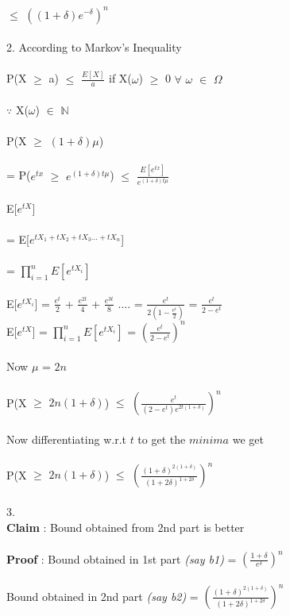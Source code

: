\documentclass{article}
\begin{document}
$\leq$ $((1 + \delta)e^{-\delta})^{n}$ \\\\
2.
According to Markov's Inequality \\\\
P(X $\geq$ a) $\leq$ $\frac{E[X]}{a}$ if X($\omega$) $\geq$ 0 $\forall$ $\omega$ $\in$ $\Omega$ \\\\
$\because$ X($\omega$) $\in$ $\mathbb{N}$ \\\\ 
P(X $\geq$ $(1 + \delta)\mu$) \\\\
= P($e^{tx}$ $\geq$ $e^{(1 + \delta)t\mu}$) $\leq$ $\frac{E[e^{tx}]}{e^{(1 + \delta)t\mu}}$\\\\
E[$e^{tX}$] \\\\
= E[$e^{tX_1 + tX_2 + tX_3 ... + tX_n}$] \\\\
=  $\prod_{i=1}^{n} E[e^{tX_i}]$ \\\\
E[$e^{tX_i}$] = $\frac{e^{t}}{2}$ + $\frac{e^{2t}}{4}$ + $\frac{e^{3t}}{8}$ .... 
= $\frac{e^{t}}{2(1-\frac{e^{t}}{2})}$
= $\frac{e^{t}}{2 - e^{t}}$ \\
E[$e^{tX}$] = $\prod_{i=1}^{n} E[e^{tX_i}]$ = $(\frac{e^{t}}{2 - e^{t}})^{n}$ \\\\
Now $\mu$ = $2n$ \\\\
P(X $\geq$ $2n(1 + \delta)$) $\leq$ $(\frac{e^{t}}{(2 - e^{t})e^{2t(1+\delta)}})^{n}$\\\\
Now differentiating w.r.t $t$ to get the $minima$ we get \\\\
P(X $\geq$ $2n(1+\delta)$) $\leq$ $(\frac{(1+\delta)^{2(1+\delta)}}{(1+2\delta)^{1+2\delta}})^{n}$ \\\\
3. \\
\textbf{Claim} : Bound obtained from 2nd part is better \\\\ 
\textbf{Proof} : Bound obtained in 1st part \textit{(say b1)} = $(\frac{1+\delta}{e^{\delta}})^{n}$ \\\\ 
Bound obtained in 2nd part \textit{(say b2)} = $(\frac{(1+\delta)^{2(1+\delta)}}{(1+2\delta)^{1+2\delta}})^{n}$ \\\\
\end{document}
